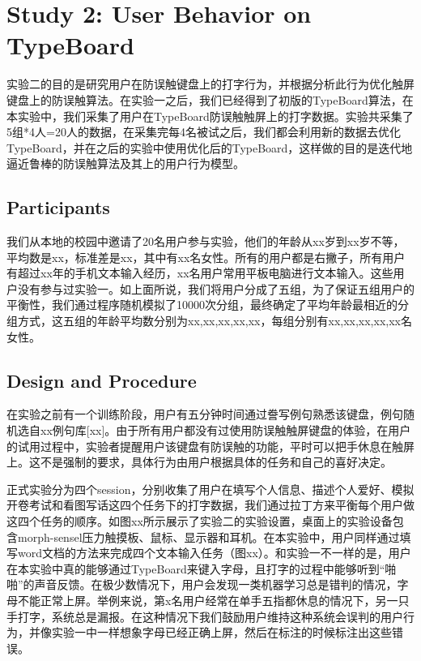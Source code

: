 \section{Study 2: User Behavior on TypeBoard}

实验二的目的是研究用户在防误触键盘上的打字行为，并根据分析此行为优化触屏键盘上的防误触算法。在实验一之后，我们已经得到了初版的TypeBoard算法，在本实验中，我们采集了用户在TypeBoard防误触触屏上的打字数据。实验共采集了5组*4人=20人的数据，在采集完每4名被试之后，我们都会利用新的数据去优化TypeBoard，并在之后的实验中使用优化后的TypeBoard，这样做的目的是迭代地逼近鲁棒的防误触算法及其上的用户行为模型。

\subsection{Participants}

我们从本地的校园中邀请了20名用户参与实验，他们的年龄从xx岁到xx岁不等，平均数是xx，标准差是xx，其中有xx名女性。所有的用户都是右撇子，所有用户有超过xx年的手机文本输入经历，xx名用户常用平板电脑进行文本输入。这些用户没有参与过实验一。如上面所说，我们将用户分成了五组，为了保证五组用户的平衡性，我们通过程序随机模拟了10000次分组，最终确定了平均年龄最相近的分组方式，这五组的年龄平均数分别为xx,xx,xx,xx,xx，每组分别有xx,xx,xx,xx,xx名女性。

\subsection{Design and Procedure}

在实验之前有一个训练阶段，用户有五分钟时间通过誊写例句熟悉该键盘，例句随机选自xx例句库[xx]。由于所有用户都没有过使用防误触触屏键盘的体验，在用户的试用过程中，实验者提醒用户该键盘有防误触的功能，平时可以把手休息在触屏上。这不是强制的要求，具体行为由用户根据具体的任务和自己的喜好决定。

正式实验分为四个session，分别收集了用户在填写个人信息、描述个人爱好、模拟开卷考试和看图写话这四个任务下的打字数据，我们通过拉丁方来平衡每个用户做这四个任务的顺序。如图xx所示展示了实验二的实验设置，桌面上的实验设备包含morph-sensel压力触摸板、鼠标、显示器和耳机。在本实验中，用户同样通过填写word文档的方法来完成四个文本输入任务（图xx）。和实验一不一样的是，用户在本实验中真的能够通过TypeBoard来键入字母，且打字的过程中能够听到“啪啪”的声音反馈。在极少数情况下，用户会发现一类机器学习总是错判的情况，字母不能正常上屏。举例来说，第x名用户经常在单手五指都休息的情况下，另一只手打字，系统总是漏报。在这种情况下我们鼓励用户维持这种系统会误判的用户行为，并像实验一中一样想象字母已经正确上屏，然后在标注的时候标注出这些错误。

